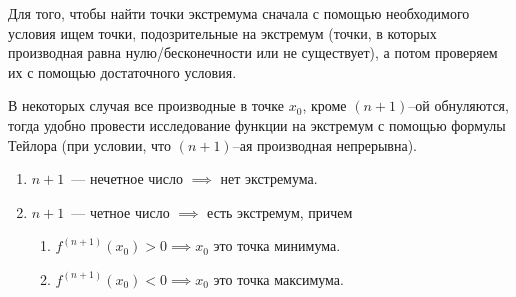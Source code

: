 \begin{remark}
  Для того, чтобы найти точки экстремума сначала с помощью необходимого условия
  ищем точки, подозрительные на экстремум (точки, в которых производная равна
  нулю/бесконечности или не существует), а потом проверяем их с помощью
  достаточного условия.
\end{remark}

\begin{theorem}
  В некоторых случая все производные в точке \(x_0\), кроме \((n + 1)\)--ой
  обнуляются, тогда удобно провести исследование функции на экстремум с помощью
  формулы Тейлора (при условии, что \((n + 1)\)--ая производная непрерывна).

  \begin{enumerate}
  \item
    \(n + 1\)~--- нечетное число \(\implies\) нет экстремума.

  \item
    \(n + 1\)~--- четное число \(\implies\) есть экстремум, причем

    \begin{enumerate}
    \item
      \(f^{(n + 1)}(x_0) > 0 \implies x_0\) это точка минимума.
      
    \item 
      \(f^{(n + 1)}(x_0) < 0 \implies x_0\) это точка максимума.
    \end{enumerate}
  \end{enumerate}
\end{theorem}

